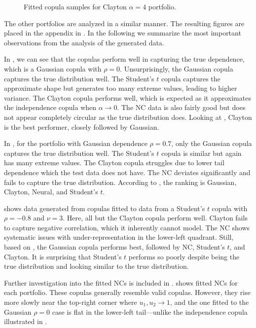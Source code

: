 \begin{figure}
\begin{minipage}{0.4\textwidth}
    \end{minipage}
    \caption{Fitted copula samples for Clayton $\alpha=4$ portfolio.}
    \label{fig:GeneratedDataClayton}
\end{figure}

The other portfolios are analyzed in a similar manner. The resulting figures are placed in the appendix in . In the following we summarize the most important observations from the analysis of the generated data.

In , we can see that the copulas perform well in capturing the true dependence, which is a Gaussian copula with $\rho = 0$. Unsurprisingly, the Gaussian copula captures the true distribution well. The Student's $t$ copula captures the approximate shape but generates too many extreme values, leading to higher variance. The Clayton copula performs well, which is expected as it approximates the independence copula when $\alpha \rightarrow 0$. The \gls{NC} data is also fairly good but does not appear completely circular as the true distribution does. Looking at , Clayton is the best performer, closely followed by Gaussian.

In , for the portfolio with Gaussian dependence $\rho = 0.7$, only the Gaussian copula captures the true distribution well. The Student's $t$ copula is similar but again has many extreme values. The Clayton copula struggles due to lower tail dependence which the test data does not have. The \gls{NC} deviates significantly and fails to capture the true distribution. According to , the ranking is Gaussian, Clayton, Neural, and Student's $t$.

 shows data generated from copulas fitted to data from a Student's $t$ copula with $\rho = -0.8$ and $\nu = 3$. Here, all but the Clayton copula perform well. Clayton fails to capture negative correlation, which it inherently cannot model. The \gls{NC} shows systematic issues with under-representation in the lower-left quadrant. Still, based on , the Gaussian copula performs best, followed by \gls{NC}, Student's $t$, and Clayton. It is surprising that Student's $t$ performs so poorly despite being the true distribution and looking similar to the true distribution.

Further investigation into the fitted \gls{NC}s is included in .  shows fitted \gls{NC}s for each portfolio. These copulas generally resemble valid copulas. However, they rise more slowly near the top-right corner where $u_1, u_2 \rightarrow 1$, and the one fitted to the Gaussian $\rho=0$ case is flat in the lower-left tail—unlike the independence copula illustrated in .

